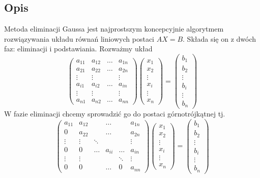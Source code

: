 \documentclass[11pt,wide]{mwart}
\begin{document}
\subsection*{Opis}
Metoda eliminacji Gaussa jest najprostszym koncepcyjnie algorytmem rozwiązywania układu równań liniowych postaci $ AX = B $.
Składa się on z dwóch faz: eliminacji i podstawiania. Rozważmy układ
$$
\left(\begin{matrix}
a_{11} & a_{12} & \ldots & a_{1n} \\
a_{21} & a_{22} & \ldots & a_{2n} \\
\vdots & \vdots & 		 & \vdots \\
a_{i1} & a_{i2} & \ldots & a_{in} \\
\vdots & \vdots & 		 & \vdots \\
a_{n1} & a_{n2} & \ldots & a_{nn}
\end{matrix}\right)
\left(\begin{matrix}
x_1 \\ x_2 \\ \vdots \\ x_i \\ \vdots \\ x_n
\end{matrix}\right) = 
\left(\begin{matrix}
b_1 \\ b_2 \\ \vdots \\ b_i \\ \vdots \\ b_n
\end{matrix}\right)
$$
W fazie eliminacji chcemy sprowadzić go do postaci górnotrójkątnej tj.
$$
\left(\begin{matrix}
a_{11} & a_{12} &  & \ldots  & & a_{1n} \\
0 & a_{22} &  & \ldots  & & a_{2n} \\
\vdots & \vdots & \ddots &		 & & \vdots \\
0 & 0 & \ldots & a_{ii}  & \ldots & a_{in} \\
\vdots & \vdots &  &		 & \ddots & \vdots \\
0 & 0 &  & \ldots  & 0 & a_{nn}
\end{matrix}\right)
\left(\begin{matrix}
x_1 \\ x_2 \\ \vdots \\ x_i \\ \vdots \\ x_n
\end{matrix}\right) = 
\left(\begin{matrix}
b_1 \\ b_2 \\ \vdots \\ b_i \\ \vdots \\ b_n
\end{matrix}\right)
$$
\end{document}
